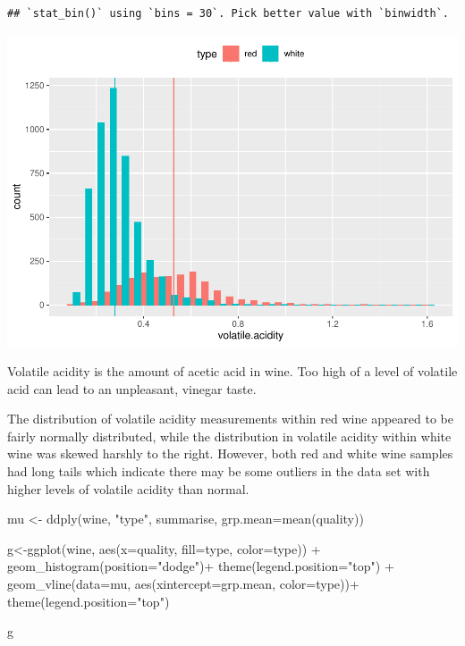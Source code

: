 \documentclass[
]{book}
\newenvironment{Shaded}{\begin{snugshade}}{\end{snugshade}}
\newcommand{\AttributeTok}[1]{\textcolor[rgb]{0.77,0.63,0.00}{#1}}
\newcommand{\FunctionTok}[1]{\textcolor[rgb]{0.00,0.00,0.00}{#1}}
\newcommand{\NormalTok}[1]{#1}
\newcommand{\OtherTok}[1]{\textcolor[rgb]{0.56,0.35,0.01}{#1}}
\newcommand{\SpecialCharTok}[1]{\textcolor[rgb]{0.00,0.00,0.00}{#1}}
\newcommand{\StringTok}[1]{\textcolor[rgb]{0.31,0.60,0.02}{#1}}
\begin{document}
\begin{verbatim}
## `stat_bin()` using `bins = 30`. Pick better value with `binwidth`.
\end{verbatim}

\includegraphics{FinalProject-Bright-Santoro_files/figure-latex/unnamed-chunk-4-1.pdf}

Volatile acidity is the amount of acetic acid in wine. Too high of a level of volatile acid can lead to an unpleasant, vinegar taste.

The distribution of volatile acidity measurements within red wine appeared to be fairly normally distributed, while the distribution in volatile acidity within white wine was skewed harshly to the right. However, both red and white wine samples had long tails which indicate there may be some outliers in the data set with higher levels of volatile acidity than normal.

\begin{Shaded}
\begin{Highlighting}[]
\NormalTok{mu }\OtherTok{\textless{}{-}} \FunctionTok{ddply}\NormalTok{(wine, }\StringTok{"type"}\NormalTok{, summarise, }\AttributeTok{grp.mean=}\FunctionTok{mean}\NormalTok{(quality))}

\NormalTok{g}\OtherTok{\textless{}{-}}\FunctionTok{ggplot}\NormalTok{(wine, }\FunctionTok{aes}\NormalTok{(}\AttributeTok{x=}\NormalTok{quality, }\AttributeTok{fill=}\NormalTok{type, }\AttributeTok{color=}\NormalTok{type)) }\SpecialCharTok{+}
  \FunctionTok{geom\_histogram}\NormalTok{(}\AttributeTok{position=}\StringTok{"dodge"}\NormalTok{)}\SpecialCharTok{+}
  \FunctionTok{theme}\NormalTok{(}\AttributeTok{legend.position=}\StringTok{"top"}\NormalTok{) }\SpecialCharTok{+} 
  \FunctionTok{geom\_vline}\NormalTok{(}\AttributeTok{data=}\NormalTok{mu, }\FunctionTok{aes}\NormalTok{(}\AttributeTok{xintercept=}\NormalTok{grp.mean, }\AttributeTok{color=}\NormalTok{type))}\SpecialCharTok{+}
  \FunctionTok{theme}\NormalTok{(}\AttributeTok{legend.position=}\StringTok{"top"}\NormalTok{)}

\NormalTok{g}
\end{Highlighting}
\end{Shaded}
\end{document}
